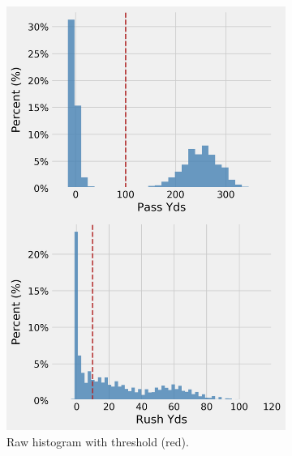 \documentclass[12pt]{article}
\begin{document}
\begin{figure}[H]
  \centering
  \begin{subfigure}[b]{0.450\textwidth}
    \centering
    \includegraphics[width=1\textwidth]{../figures/no_theshold_example_hists}
    \caption{Raw histogram with threshold (red).}
  \end{subfigure}
  \hfill
  \begin{subfigure}[b]{0.450\textwidth}
    \centering

\end{subfigure}
\end{figure}
\end{document}
